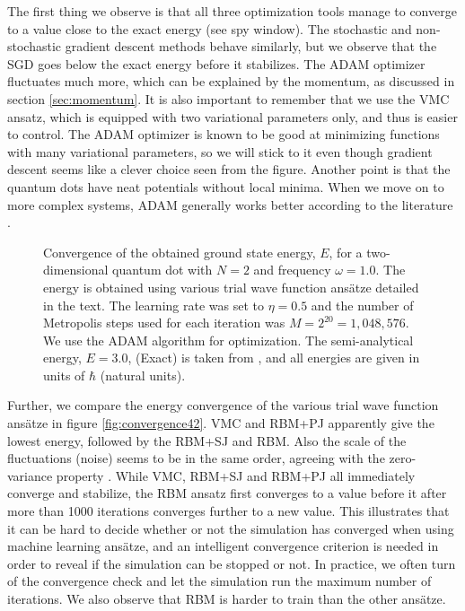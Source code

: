 The first thing we observe is that all three optimization tools manage to converge to a value close to the exact energy (see spy window). The stochastic and non-stochastic gradient descent methods behave similarly, but we observe that the SGD goes below the exact energy before it stabilizes. The ADAM optimizer fluctuates much more, which can be explained by the momentum, as discussed in section \ref{sec:momentum}. It is also important to remember that we use the VMC ansatz, which is equipped with two variational parameters only, and thus is easier to control. The ADAM optimizer is known to be good at minimizing functions with many variational parameters, so we will stick to it even though gradient descent seems like a clever choice seen from the figure. Another point is that the quantum dots have neat potentials without local minima. When we move on to more complex systems, ADAM generally works better according to the literature \supercite{kingma_adam:_2014}.

\begin{figure}
	\centering 
	\subfloat{{}}
	\caption{Convergence of the obtained ground state energy, $E$, for a two-dimensional quantum dot with $N=2$ and frequency $\omega=1.0$. The energy is obtained using various trial wave function ansätze detailed in the text. The learning rate was set to $\eta=0.5$ and the number of Metropolis steps used for each iteration was $M=2^{20}=1,048,576$. We use the ADAM algorithm for optimization. The semi-analytical energy, $E=3.0$, (Exact) is taken from \citet{taut_two_1993}, and all energies are given in units of $\hbar$ (natural units).}
	\label{fig:convergence42}
\end{figure} 

Further, we compare the energy convergence of the various trial wave function ansätze in figure \eqref{fig:convergence42}. VMC and RBM+PJ apparently give the lowest energy, followed by the RBM+SJ and RBM. Also the scale of the fluctuations (noise) seems to be in the same order, agreeing with the zero-variance property \supercite{assaraf_zero-variance_2003}. While VMC, RBM+SJ and RBM+PJ all immediately converge and stabilize, the RBM ansatz first converges to a value before it after more than 1000 iterations converges further to a new value. This illustrates that it can be hard to decide whether or not the simulation has converged when using machine learning ansätze, and an intelligent convergence criterion is needed in order to reveal if the simulation can be stopped or not. In practice, we often turn of the convergence check and let the simulation run the maximum number of iterations. We also observe that RBM is harder to train than the other ansätze.

